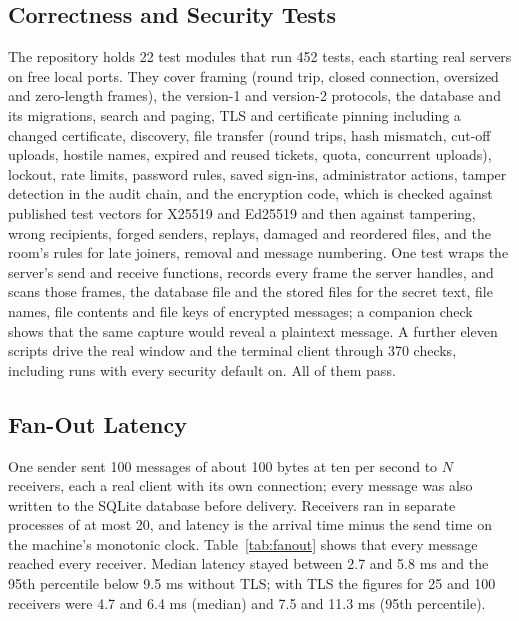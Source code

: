 \documentclass[conference]{IEEEtran}
\begin{document}
\subsection{Correctness and Security Tests}
The repository holds 22 test modules that run 452 tests, each starting real servers on free local ports. They cover framing (round trip, closed connection, oversized and zero-length frames), the version-1 and version-2 protocols, the database and its migrations, search and paging, TLS and certificate pinning including a changed certificate, discovery, file transfer (round trips, hash mismatch, cut-off uploads, hostile names, expired and reused tickets, quota, concurrent uploads), lockout, rate limits, password rules, saved sign-ins, administrator actions, tamper detection in the audit chain, and the encryption code, which is checked against published test vectors for X25519 and Ed25519 \cite{rfc7748,rfc8032} and then against tampering, wrong recipients, forged senders, replays, damaged and reordered files, and the room's rules for late joiners, removal and message numbering. One test wraps the server's send and receive functions, records every frame the server handles, and scans those frames, the database file and the stored files for the secret text, file names, file contents and file keys of encrypted messages; a companion check shows that the same capture would reveal a plaintext message. A further eleven scripts drive the real window and the terminal client through 370 checks, including runs with every security default on. All of them pass.

\subsection{Fan-Out Latency}
One sender sent 100 messages of about 100 bytes at ten per second to $N$ receivers, each a real client with its own connection; every message was also written to the SQLite database before delivery. Receivers ran in separate processes of at most 20, and latency is the arrival time minus the send time on the machine's monotonic clock. Table~\ref{tab:fanout} shows that every message reached every receiver. Median latency stayed between 2.7 and 5.8 ms and the 95th percentile below 9.5 ms without TLS; with TLS the figures for 25 and 100 receivers were 4.7 and 6.4 ms (median) and 7.5 and 11.3 ms (95th percentile).
\end{document}
